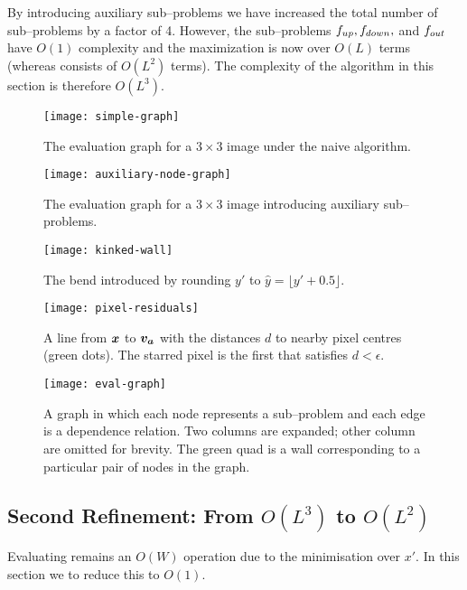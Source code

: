 By introducing auxiliary sub--problems we have increased the total
number of sub--problems by a factor of 4. However, the sub--problems
$\SubProbUP, \SubProbDOWN,$ and $\SubProbOUT$ have $O(1)$ complexity
and the maximization  is now over $O(L)$
terms (whereas  consists of $O(L^2)$
terms). The complexity of the algorithm in this section is therefore
$O(L^3)$.

\begin{figure}[tb]%
  \centering
  \label{fig:graph-simple}
  \texttt{[image: simple-graph]}
  \caption{The evaluation graph for a $3 \times 3$ image under
    the naive algorithm.}
\end{figure}

\begin{figure}[tb]%
  \centering
  \label{fig:graph-aux}
  \texttt{[image: auxiliary-node-graph]}
  \caption{The evaluation graph for a $3 \times 3$ image introducing
    auxiliary sub--problems.}
\end{figure}

\begin{figure}[tb]%
  \centering
  \label{fig:kinked-wall}
  \texttt{[image: kinked-wall]}
  \caption{The bend introduced by rounding $y'$ to $\hat{y}=\lfloor
    y'+0.5 \rfloor$.}
\end{figure}

\begin{figure}
  \centering
  \texttt{[image: pixel-residuals]}
  \label{fig:pixel-residuals}
  \caption{A line from $\vect{x}$ to
    $\vect{v_a}$ with the distances $d$ to nearby pixel centres (green
    dots). The starred pixel is the first that satisfies
    $d<\epsilon$.}
\end{figure}

\begin{figure}
  \centering
  \texttt{[image: eval-graph]}
  \label{fig:eval-graph}
  \caption{A graph in which each node represents a
    sub--problem and each edge is a dependence relation. Two columns
    are expanded; other column are omitted for brevity. The green quad
    is a wall corresponding to a particular pair of nodes in the
    graph.}
\end{figure}

\subsection{Second Refinement: From $O(L^3)$ to $O(L^2)$}
Evaluating  remains an $O(W)$ operation
due to the minimisation over $x'$. In this section we to reduce this
to $O(1)$.

